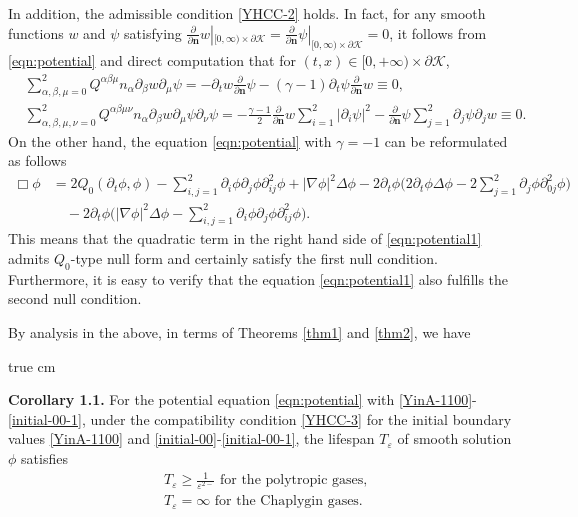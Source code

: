 \documentclass[11pt,twoside]{article}
\def\cK{\mathcal K}
\def\f{\frac}
\def\p{\partial}
\def\ve{\varepsilon}
\def\bn{\mathbf{n}}
\theoremstyle{plain}
\theoremstyle{definition}
\numberwithin{equation}{section}
\begin{document}
In addition, the admissible condition \eqref{YHCC-2} holds. In fact, for any smooth functions
$w$ and $\psi$ satisfying $\f{\p}{\p\bn}w|_{[0,\infty)\times\p\cK}=\f{\p}{\p\bn}\psi|_{[0,\infty)\times\p\cK}=0$,
it follows from \eqref{eqn:potential} and direct computation that for $(t,x)\in[0,+\infty)\times\p\cK$,
\begin{equation}\label{YHHC-111}
\begin{split}
&\sum_{\alpha,\beta,\mu=0}^2Q^{\alpha\beta\mu}n_{\alpha}\p_{\beta}w\p_{\mu}\psi=-\p_tw\f{\p}{\p\bn}\psi-(\gamma-1)\p_t\psi\f{\p}{\p\bn}w\equiv0,\\
&\sum_{\alpha,\beta,\mu,\nu=0}^2Q^{\alpha\beta\mu\nu}n_{\alpha}\p_{\beta}w\p_{\mu}\psi\p_{\nu}\psi=-\f{\gamma-1}{2}
\f{\p}{\p\bn}w\sum_{i=1}^2|\p_i\psi|^2-\f{\p}{\p\bn}\psi\sum_{j=1}^2\p_j\psi\p_jw\equiv0.
\end{split}
\end{equation}
On the other hand, the equation \eqref{eqn:potential} with $\gamma=-1$ can be reformulated as follows
\begin{equation}\label{eqn:potential1}
\begin{split}
\Box\phi&=2Q_0(\p_t\phi,\phi)-\sum_{i,j=1}^2\p_i\phi\p_j\phi\p^2_{ij}\phi+|\nabla\phi|^2\Delta\phi-2\p_t\phi\big(2\p_t\phi\Delta\phi
-2\sum_{j=1}^2\p_j\phi\p^2_{0j}\phi\big)\\
&\quad -2\p_t\phi\big(|\nabla\phi|^2\Delta\phi-\sum_{i,j=1}^2\p_i\phi\p_j\phi\p^2_{ij}\phi\big).
\end{split}
\end{equation}
This means that the quadratic term in the right hand side of \eqref{eqn:potential1} admits $Q_0$-type null form
and certainly satisfy the first null condition. Furthermore, it is easy to verify that the equation \eqref{eqn:potential1}
also fulfills the second null condition.


By analysis in the above, in terms of Theorems \ref{thm1} and \ref{thm2}, we have

 true cm

{\bf Corollary 1.1.} For the potential equation \eqref{eqn:potential} with \eqref{YinA-1100}-\eqref{initial-00-1},
under the compatibility condition \eqref{YHCC-3} for the initial boundary values \eqref{YinA-1100} and \eqref{initial-00}-\eqref{initial-00-1},
the lifespan $T_{\ve}$ of smooth solution $\phi$ satisfies
\begin{equation}\label{YHCC0-2}
\begin{split}
&\text{$T_\ve\ge\frac{1}{\ve^{2-}}$ for the polytropic gases,}\\
&\text{$T_\ve=\infty$ for the Chaplygin gases.}
\end{split}
\end{equation}
\end{document}
